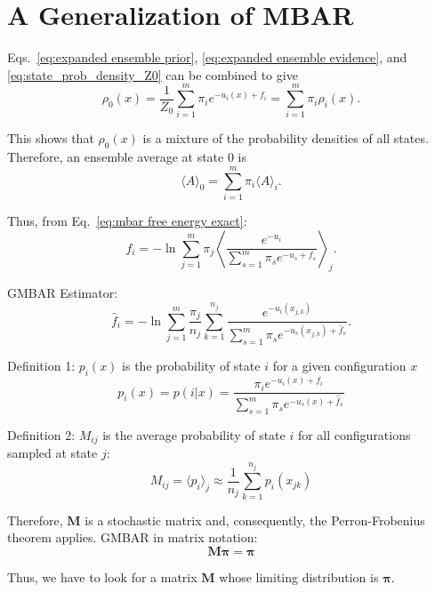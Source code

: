 \documentclass[aip,jcp,reprint,amsmath,amssymb]{revtex4-1}
\newcommand{\mt}[1]{\boldsymbol{\mathbf{#1}}}           %
\newcommand{\vt}[1]{\boldsymbol{\mathbf{#1}}}           %
\begin{document}
\section{A Generalization of MBAR}

Eqs.~\eqref{eq:expanded ensemble prior}, \eqref{eq:expanded ensemble evidence}, and \eqref{eq:state_prob_density_Z0} can be combined to give
\begin{equation*}
\rho_0(x) = \frac{1}{Z_0} \sum_{i=1}^m \pi_i e^{-u_i(x) + f_i} = \sum_{i=1}^m \pi_i \rho_i(x).
\end{equation*}

This shows that $\rho_0(x)$ is a mixture of the probability densities of all states. Therefore, an ensemble average at state $0$ is
\begin{equation*}
\langle A \rangle_0 = \sum_{i=1}^m \pi_i \langle A \rangle_i.
\end{equation*}

Thus, from Eq.~\eqref{eq:mbar free energy exact}:
\begin{equation}
f_i = -\ln \sum_{j=1}^m \pi_j \left\langle \frac{e^{-u_i}}{\sum_{s=1}^m \pi_s e^{-u_s + f_s}} \right\rangle_j.
\end{equation}

GMBAR Estimator:
\begin{equation}
\hat f_i = -\ln \sum_{j=1}^m \frac{\pi_j}{n_j} \sum_{k=1}^{n_j} \frac{e^{-u_i(x_{j,k})}}{\sum_{s=1}^m \pi_s e^{-u_s(x_{j,k}) + \hat f_s}}.
\end{equation}


Definition 1: $p_i(x)$ is the probability of state $i$ for a given configuration $x$
\begin{equation}
p_i(x) = p(i|x) = \frac{\pi_i e^{-u_i(x) + f_i}}{\sum_{s=1}^m \pi_s e^{-u_s(x) + \hat f_s}}
\end{equation}

Definition 2: $M_{ij}$ is the average probability of state $i$ for all configurations sampled at state $j$:
\begin{equation*}
M_{ij} = \langle p_i \rangle_j \approx \frac{1}{n_j} \sum_{k=1}^{n_j} p_i(x_{jk})
\end{equation*}

Therefore, $\vt M$ is a stochastic matrix and, consequently, the Perron-Frobenius theorem applies. GMBAR in matrix notation:
\begin{equation*}
\mt M \vt \pi = \vt \pi
\end{equation*}

Thus, we have to look for a matrix $\mt M$ whose limiting distribution is $\vt \pi$.
\end{document}
